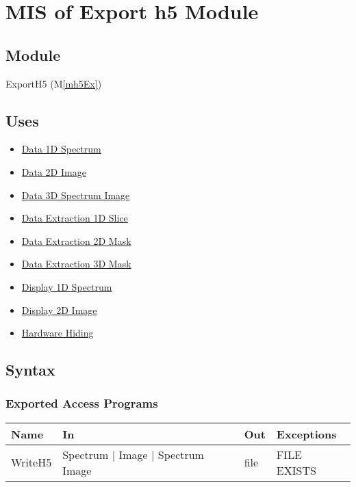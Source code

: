 \documentclass[12pt, titlepage]{article}
\newcommand{\mref}[1]{M\ref{#1}}
\begin{document}
\newpage
\section{MIS of Export h5 Module} \label{Mod:ExportH5}

\subsection{Module}

ExportH5 (\mref{mh5Ex})

\subsection{Uses}
\begin{itemize}
    \item \hyperref[Mod:Spectrum]{Data 1D Spectrum}
    \item \hyperref[Mod:Image]{Data 2D Image}
    \item \hyperref[Mod:SI]{Data 3D Spectrum Image}
    \item \hyperref[Mod:Slice1D]{Data Extraction 1D Slice}
    \item \hyperref[Mod:Mask2D]{Data Extraction 2D Mask}
    \item \hyperref[Mod:Mask3D]{Data Extraction 3D Mask}
    \item \hyperref[Mod:Disp1D]{Display 1D Spectrum}
    \item \hyperref[Mod:Disp2D]{Display 2D Image}
    \item \hyperref[Mod:HH]{Hardware Hiding}
\end{itemize}

\subsection{Syntax}

\subsubsection{Exported Access Programs}

\begin{center}
    \begin{tabular}{p{2cm} p{4cm} p{2cm} p{4cm}}
        \hline
        \textbf{Name} & \textbf{In} & \textbf{Out} & \textbf{Exceptions} \\
        \hline
        WriteH5 & Spectrum $|$ Image $|$ Spectrum Image & file & FILE EXISTS \\
        \hline
    \end{tabular}
\end{center}
\end{document}
